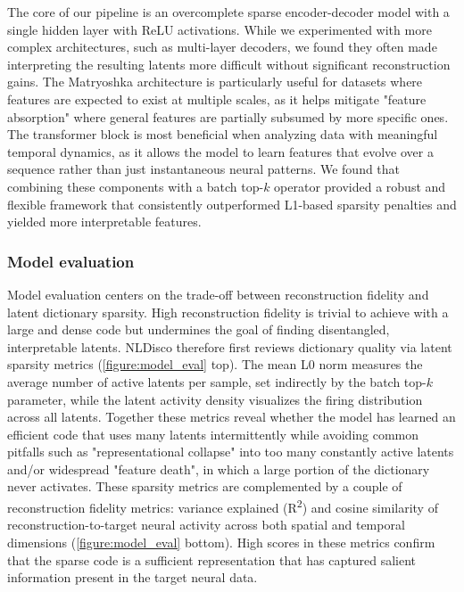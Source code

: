 The core of our pipeline is an overcomplete sparse encoder-decoder model with a single hidden layer with ReLU activations. While we experimented with more complex architectures, such as multi-layer decoders, we found they often made interpreting the resulting latents more difficult without significant reconstruction gains. The Matryoshka architecture is particularly useful for datasets where features are expected to exist at multiple scales, as it helps mitigate "feature absorption" where general features are partially subsumed by more specific ones\citep{bussmann_2025_msae}. The transformer block is most beneficial when analyzing data with meaningful temporal dynamics, as it allows the model to learn features that evolve over a sequence rather than just instantaneous neural patterns. We found that combining these components with a batch top-$k$ operator provided a robust and flexible framework that consistently outperformed L1-based sparsity penalties and yielded more interpretable features.

\subsubsection{Model evaluation}
\label{subsubsection:model_evaluation_details}

Model evaluation centers on the trade-off between reconstruction fidelity and latent dictionary sparsity. High reconstruction fidelity is trivial to achieve with a large and dense code but undermines the goal of finding disentangled, interpretable latents. NLDisco therefore first reviews dictionary quality via latent sparsity metrics (\autoref{figure:model_eval} top). The mean L0 norm measures the average number of active latents per sample, set indirectly by the batch top-$k$ parameter, while the latent activity density visualizes the firing distribution across all latents. Together these metrics reveal whether the model has learned an efficient code that uses many latents intermittently while avoiding common pitfalls such as "representational collapse" into too many constantly active latents and/or widespread "feature death", in which a large portion of the dictionary never activates. These sparsity metrics are complemented by a couple of reconstruction fidelity metrics: variance explained (R\textsuperscript{2}) and cosine similarity of reconstruction-to-target neural activity across both spatial and temporal dimensions (\autoref{figure:model_eval} bottom). High scores in these metrics confirm that the sparse code is a sufficient representation that has captured salient information present in the target neural data.

